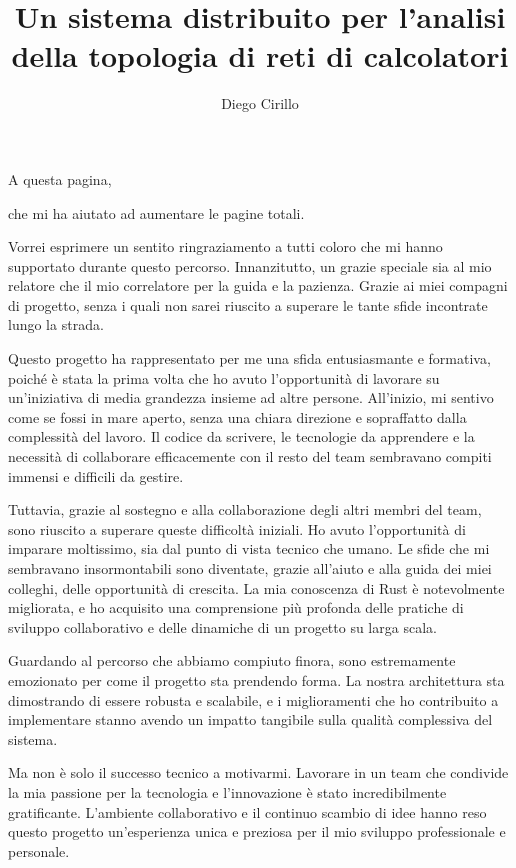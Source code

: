 \documentclass[target=bach,aauheader=,style=]{thud}
\title{Un sistema distribuito per l'analisi della topologia di reti di calcolatori}
\author{Diego Cirillo}
\begin{document}
\maketitle

\begin{dedication}
	A questa pagina, \par che mi ha aiutato ad aumentare le pagine totali.
\end{dedication}

\acknowledgements
Vorrei esprimere un sentito ringraziamento a tutti coloro che mi hanno supportato durante questo percorso. Innanzitutto, un grazie speciale sia al mio relatore che il mio correlatore per la guida e la pazienza. Grazie ai miei compagni di progetto, senza i quali non sarei riuscito a superare le tante sfide incontrate lungo la strada.


Questo progetto ha rappresentato per me una sfida entusiasmante e formativa, poiché è stata la prima volta che ho avuto l'opportunità di lavorare su un'iniziativa di media grandezza insieme ad altre persone. All'inizio, mi sentivo come se fossi in mare aperto, senza una chiara direzione e sopraffatto dalla complessità del lavoro. Il codice da scrivere, le tecnologie da apprendere e la necessità di collaborare efficacemente con il resto del team sembravano compiti immensi e difficili da gestire.


Tuttavia, grazie al sostegno e alla collaborazione degli altri membri del team, sono riuscito a superare queste difficoltà iniziali. Ho avuto l'opportunità di imparare moltissimo, sia dal punto di vista tecnico che umano. Le sfide che mi sembravano insormontabili sono diventate, grazie all'aiuto e alla guida dei miei colleghi, delle opportunità di crescita. La mia conoscenza di Rust è notevolmente migliorata, e ho acquisito una comprensione più profonda delle pratiche di sviluppo collaborativo e delle dinamiche di un progetto su larga scala.


Guardando al percorso che abbiamo compiuto finora, sono estremamente emozionato per come il progetto sta prendendo forma. La nostra architettura sta dimostrando di essere robusta e scalabile, e i miglioramenti che ho contribuito a implementare stanno avendo un impatto tangibile sulla qualità complessiva del sistema.


Ma non è solo il successo tecnico a motivarmi. Lavorare in un team che condivide la mia passione per la tecnologia e l'innovazione è stato incredibilmente gratificante. L'ambiente collaborativo e il continuo scambio di idee hanno reso questo progetto un'esperienza unica e preziosa per il mio sviluppo professionale e personale.
\end{document}
